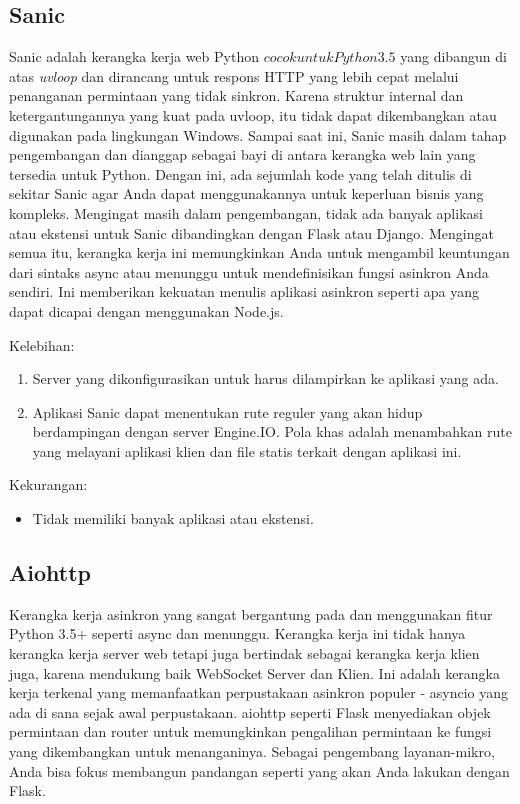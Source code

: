 \subsection{Sanic}

Sanic adalah kerangka kerja web Python \(cocok untuk Python 3.5\) yang dibangun di atas \textit{uvloop} dan dirancang untuk respons HTTP yang lebih cepat melalui penanganan permintaan yang tidak sinkron. Karena struktur internal dan ketergantungannya yang kuat pada uvloop, itu tidak dapat dikembangkan atau digunakan pada lingkungan Windows. Sampai saat ini, Sanic masih dalam tahap pengembangan dan dianggap sebagai bayi di antara kerangka web lain yang tersedia untuk Python. Dengan ini, ada sejumlah kode yang telah ditulis di sekitar Sanic agar Anda dapat menggunakannya untuk keperluan bisnis yang kompleks. Mengingat masih dalam pengembangan, tidak ada banyak aplikasi atau ekstensi untuk Sanic dibandingkan dengan Flask atau Django. Mengingat semua itu, kerangka kerja ini memungkinkan Anda untuk mengambil keuntungan dari sintaks async atau menunggu untuk mendefinisikan fungsi asinkron Anda sendiri. Ini memberikan kekuatan menulis aplikasi asinkron seperti apa yang dapat dicapai dengan menggunakan Node.js.

Kelebihan:
\begin{enumerate}
\item Server yang dikonfigurasikan untuk harus dilampirkan ke aplikasi yang ada.
\item Aplikasi Sanic dapat menentukan rute reguler yang akan hidup berdampingan dengan server Engine.IO. Pola khas adalah menambahkan rute yang melayani aplikasi klien dan file statis terkait dengan aplikasi ini.
\end{enumerate}

Kekurangan:
\begin{itemize}
\item Tidak memiliki banyak aplikasi atau ekstensi.
\end{itemize}

\subsection{Aiohttp}

Kerangka kerja asinkron yang sangat bergantung pada dan menggunakan fitur Python 3.5+ seperti async dan menunggu. Kerangka kerja ini tidak hanya kerangka kerja server web tetapi juga bertindak sebagai kerangka kerja klien juga, karena mendukung baik WebSocket Server dan Klien. Ini adalah kerangka kerja terkenal yang memanfaatkan perpustakaan asinkron populer - asyncio yang ada di sana sejak awal perpustakaan. aiohttp seperti Flask menyediakan objek permintaan dan router untuk memungkinkan pengalihan permintaan ke fungsi yang dikembangkan untuk menanganinya. Sebagai pengembang layanan-mikro, Anda bisa fokus membangun pandangan seperti yang akan Anda lakukan dengan Flask.

